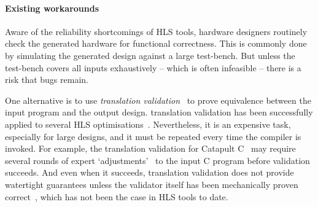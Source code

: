 \paragraph{Existing workarounds}

Aware of the reliability shortcomings of \gls{HLS} tools, hardware designers
routinely check the generated hardware for functional correctness.  This is
commonly done by simulating the generated design against a large test-bench.
But unless the test-bench covers all inputs exhaustively -- which is often
infeasible -- there is a risk that bugs remain.

One alternative is to use \emph{\gls{translation
    validation}}~\cite{pnueli98_trans} to prove equivalence between the input
program and the output design. \Gls{translation validation} has been
successfully applied to several \gls{HLS} optimisations~\cite{kim04_autom_fsmd,
  karfa06_formal_verif_method_sched_high_synth,
  chouksey20_verif_sched_condit_behav_high_level_synth,
  banerjee14_verif_code_motion_techn_using_value_propag,
  chouksey19_trans_valid_code_motion_trans_invol_loops}.  Nevertheless, it is an
expensive task, especially for large designs, and it must be repeated every time
the compiler is invoked.  For example, the translation validation for Catapult
C~\cite{mentor20_catap_high_level_synth} may require several rounds of expert
`adjustments'~\cite[p.~3]{slec_whitepaper} to the input C program before
validation succeeds. And even when it succeeds, translation validation does not
provide watertight guarantees unless the validator itself has been mechanically
proven correct~\cite[e.g.][]{tristan08_formal_verif_trans_valid}, which has not
been the case in \gls{HLS} tools to date.


